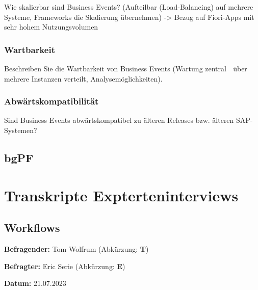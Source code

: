 Wie skalierbar sind Business Events? (Aufteilbar (Load-Balancing) auf mehrere Systeme, Frameworks die Skalierung übernehmen) -> Bezug auf Fiori-Apps mit sehr hohem Nutzungsvolumen

\subsubsection{Wartbarkeit}

Beschreiben Sie die Wartbarkeit von Business Events (Wartung zentral  über mehrere Instanzen verteilt, Analysemöglichkeiten). 

\subsubsection{Abwärtskompatibilität}

Sind Business Events abwärtskompatibel zu älteren Releases bzw. älteren SAP-Systemen?

\subsection{bgPF} \label{FB_bgPF}

\section{Transkripte Expterteninterviews}

\subsection{Workflows} \label{T_Workflows}

\textbf{Befragender:} Tom Wolfrum (Abkürzung: \textbf{T})

\textbf{Befragter:} Eric Serie (Abkürzung: \textbf{E})

\textbf{Datum:} 21.07.2023

